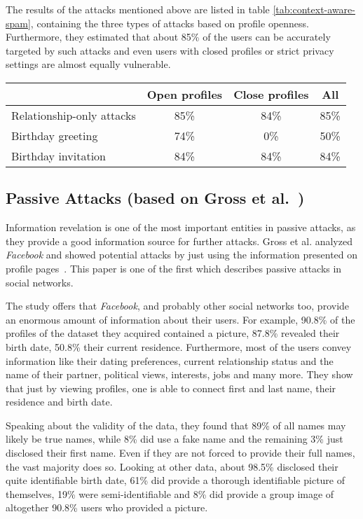 The results of the attacks mentioned above are listed in table
\ref{tab:context-aware-spam}, containing the three types of attacks based on
profile openness. Furthermore, they estimated that about 85\% of the users
can be accurately targeted by such attacks and even users with closed
profiles or strict privacy settings are almost equally vulnerable.

\begin{table*}[ht]
  \centering
  \begin{tabular}{lccc}
    \toprule
    & Open profiles & Close profiles & All\\
    \midrule
    Relationship-only attacks & 85\% & 84\% & 85\% \\
    Birthday greeting         & 74\% &  0\% & 50\% \\
    Birthday invitation       & 84\% & 84\% & 84\% \\
    \bottomrule
  \end{tabular}
  \caption{Results of the case study of Brown et al.~\cite{brown2008}}
  \label{tab:context-aware-spam}
\end{table*}

\subsection[Passive Attacks]{Passive Attacks (based on Gross et al.~\cite{gross2005})}

Information revelation is one of the most important entities in passive attacks,
as they provide a good information source for further attacks. Gross et al.
analyzed \textit{Facebook} and showed potential attacks by just using the
information presented on profile pages~\cite{gross2005}. This paper is one
of the first which describes passive attacks in social networks.

The study offers that \textit{Facebook}, and probably other social networks
too, provide an enormous amount of information about their users. For example,
90.8\% of the profiles of the dataset they acquired contained a picture, 87.8\%
revealed their birth date, 50.8\% their current residence. Furthermore, most of
the users convey information like their dating preferences, current relationship
status and the name of their partner, political views, interests, jobs and many
more. They show that just by viewing profiles, one is able to connect first
and last name, their residence and birth date.

Speaking about the validity of the data, they found that 89\% of all names may
likely be true names, while 8\% did use a fake name and the remaining 3\% just
disclosed their first name. Even if they are not forced to provide their full
names, the vast majority does so. Looking at other data, about 98.5\% disclosed
their quite identifiable birth date, 61\% did provide a thorough identifiable
picture of themselves, 19\% were semi-identifiable and 8\% did provide a group
image of altogether 90.8\% users who provided a picture.

